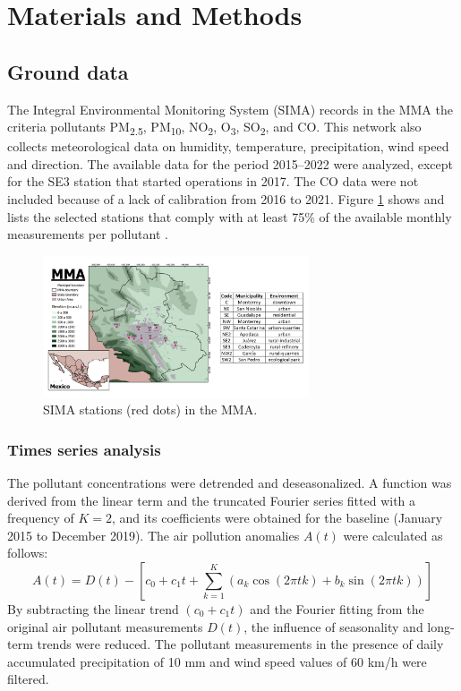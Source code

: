 \documentclass[sn-mathphys-num]{sn-jnl}
\begin{document}
\section{Materials and Methods}
\subsection{Ground data}
The Integral Environmental Monitoring System (SIMA) records in the MMA the criteria pollutants PM\textsubscript{2.5}, PM\textsubscript{10}, NO\textsubscript{2}, O\textsubscript{3}, SO\textsubscript{2}, and CO. This network also collects meteorological data on humidity, temperature, precipitation, wind speed and direction. The available data for the period 2015--2022 were analyzed, except for the SE3 station that started operations in 2017. The CO data were not included because of a lack of calibration from 2016 to 2021. Figure \ref{596247} shows and lists the selected stations that comply with at least 75\% of the available monthly measurements per pollutant \citep{mtodos}.
\begin{figure}[H]
	\begin{center}
		\includegraphics[width=0.70\textwidth]{figures/amm_tabla.png}
		\caption{SIMA stations (red dots) in the MMA.
				{\label{596247}}}
	\end{center}
\end{figure}
\subsubsection{Times series analysis}
The pollutant concentrations were detrended and deseasonalized. A function was derived from the linear term and the truncated Fourier series fitted with a frequency of \(K=2\), and its coefficients were obtained \citep{Hernandez-Paniagua2021} for the baseline (January 2015 to December 2019). The air pollution anomalies \(A\left(t\right)\) were calculated as follows:
\begin{equation}
	A\left(t\right)=D\left(t\right)-\left[c_0+c_1t+ \sum_{k=1}^{K}\left(a_{k}\cos(2\pi tk)+b_{k}\sin(2\pi tk)\right)\right]
	\label{eq:anomalies}
\end{equation}
By subtracting the linear trend \((c_{0}+c_{1}t)\) and the Fourier fitting from the original air pollutant measurements \(D(t)\), the influence of seasonality and long-term trends were reduced. The pollutant measurements in the presence of daily accumulated precipitation of 10 mm and wind speed values of 60 km/h were filtered.
\end{document}
